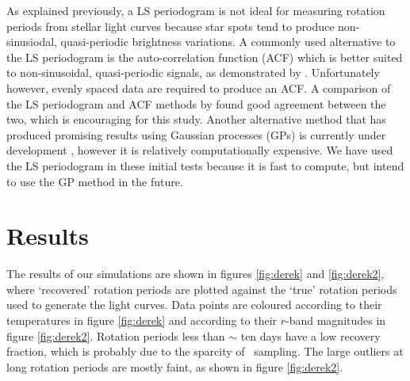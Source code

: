 As explained previously, a LS periodogram is not ideal for measuring rotation
periods from stellar light curves because star spots tend to produce
non-sinusiodal, quasi-periodic brightness variations.
A commonly used alternative to the LS periodogram is the auto-correlation
function (ACF) which is better suited to non-sinusoidal, quasi-periodic
signals, as demonstrated by \citet{Mcquillan2013}.
Unfortunately however, evenly spaced data are required to produce an ACF.
A comparison of the LS periodogram and ACF methods by \citet{Aigrain2015b}
found good agreement between the two, which is encouraging for this study.
Another alternative method that has produced promising results using Gaussian
processes (GPs) is currently under development \citep{Angus2015b}, however it
is relatively computationally expensive.
We have used the LS periodogram in these initial tests because it is fast to
compute, but intend to use the GP method in the future.

\section{Results}

The results of our simulations are shown in figures \ref{fig:derek} and
\ref{fig:derek2}, where `recovered' rotation periods are plotted against the
`true' rotation periods used to generate the light curves.
Data points are coloured according to their temperatures in figure
\ref{fig:derek} and according to their $r$-band magnitudes in figure
\ref{fig:derek2}.
Rotation periods less than $\sim$ ten days have a low recovery fraction, which
is probably due to the sparcity of \LSST\ sampling.
The large outliers at long rotation periods are mostly faint, as shown in
figure \ref{fig:derek2}.

